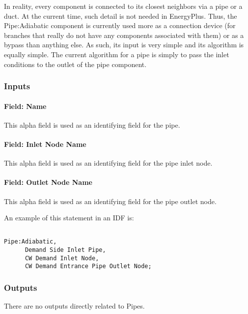 In reality, every component is connected to its closest neighbors via a pipe or a duct. At the current time, such detail is not needed in EnergyPlus. Thus, the Pipe:Adiabatic component is currently used more as a connection device (for branches that really do not have any components associated with them) or as a bypass than anything else. As such, its input is very simple and its algorithm is equally simple. The current algorithm for a pipe is simply to pass the inlet conditions to the outlet of the pipe component.

\subsubsection{Inputs}\label{inputs-4-019}

\paragraph{Field: Name}\label{field-name-4-016}

This alpha field is used as an identifying field for the pipe.

\paragraph{Field: Inlet Node Name}\label{field-inlet-node-name-001}

This alpha field is used as an identifying field for the pipe inlet node.

\paragraph{Field: Outlet Node Name}\label{field-outlet-node-name-002}

This alpha field is used as an identifying field for the pipe outlet node.

An example of this statement in an IDF is:

\begin{lstlisting}

Pipe:Adiabatic,
      Demand Side Inlet Pipe,
      CW Demand Inlet Node,
      CW Demand Entrance Pipe Outlet Node;
\end{lstlisting}

\subsubsection{Outputs}\label{outputs-4-009}

There are no outputs directly related to Pipes.

